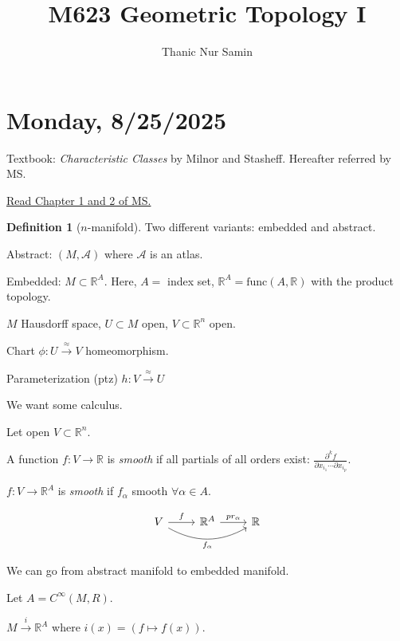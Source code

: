 \documentclass{article}
\title{M623 Geometric Topology I}
\author{Thanic Nur Samin}
\date{}
\theoremstyle{definition}
\newtheorem*{definition}{Definition}
\begin{document}
    \maketitle

    \section*{Monday, 8/25/2025}

    Textbook: \textit{Characteristic Classes} by Milnor and Stasheff. Hereafter referred by MS.

    \underline{Read Chapter 1 and 2 of MS.}

    \begin{definition}
        [\(n\)-manifold]

        Two different variants: embedded and abstract.

    

        Abstract: \((M, \mathcal{A})\) where \(\mathcal{A}\) is an atlas.
    \end{definition}

    Embedded: \(M \subset \mathbb{R}^A\). Here, \(A =\) index set, \(\mathbb{R}^A = \text{func}(A,\mathbb{R})\) with the product topology.

    \(M\) Hausdorff space, \(U \subset M\) open, \(V \subset \mathbb{R}^n\) open.
        
    Chart \(\phi : U \xrightarrow{\approx} V\) homeomorphism.

    Parameterization (ptz) \(h: V \xrightarrow{\approx} U\)

    We want some calculus.

    Let open \(V \subset \mathbb{R}^n\).

    A function \(f: V \to \mathbb{R}\) is \textit{smooth} if all partials of all orders exist: \(\frac{\partial^k f}{\partial x_{i_1} \cdots \partial x_{i_{p}}}\).

    \(f: V \to \mathbb{R}^A\) is \textit{smooth} if \(f_\alpha\) smooth \(\forall \alpha \in A\).

    \[
        \begin{tikzcd}
            V \ar[rr, bend right,"f_\alpha"'] \ar[r,"f"] & \mathbb{R}^A \ar[r,"pr_{\alpha}"] & \mathbb{R}
        \end{tikzcd}
    \]

    We can go from abstract manifold to embedded manifold.

    Let \(A = C^{\infty} (M,R)\).

    \(M \xrightarrow{i}\mathbb{R}^A\) where \(i(x) = (f \mapsto f(x))\).
\end{document}
